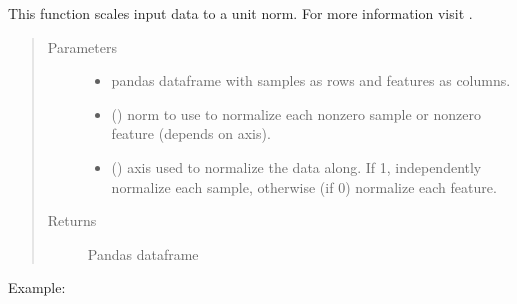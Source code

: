 \documentclass[letterpaper,10pt,english]{sphinxmanual}
\begin{document}
\begin{fulllineitems}
\label{\detokenize{_autosummary/analytics_core.analytics:analytics_core.analytics.analytics.linear_normalization}}
This function scales input data to a unit norm. For more information visit .
\begin{quote}\begin{description}
\item[{Parameters}] \leavevmode\begin{itemize}
\item {} 
 \textendash{} pandas dataframe with samples as rows and features as columns.

\item {} 
 () \textendash{} norm to use to normalize each non\sphinxhyphen{}zero sample or non\sphinxhyphen{}zero feature (depends on axis).

\item {} 
 () \textendash{} axis used to normalize the data along. If 1, independently normalize each sample, otherwise (if 0) normalize each feature.

\end{itemize}

\item[{Returns}] \leavevmode
Pandas dataframe

\end{description}\end{quote}

Example:

\begin{sphinxVerbatim}[commandchars=\\\{\}]
        
\end{sphinxVerbatim}

\end{fulllineitems}
\end{document}
